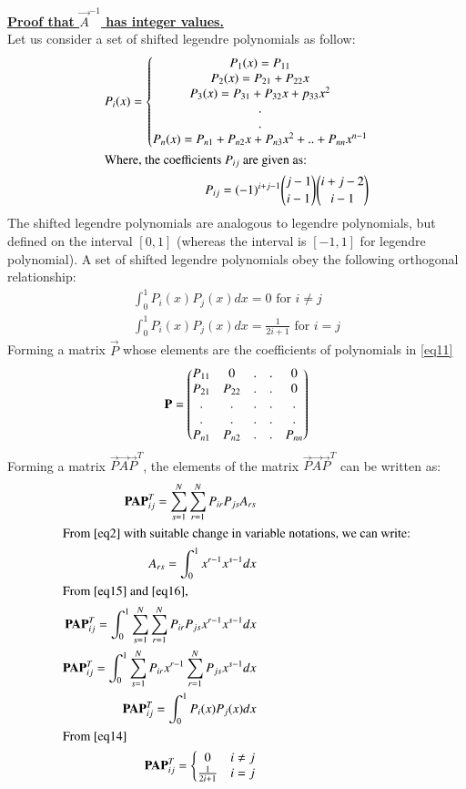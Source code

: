 \documentclass[journal,12pt,twocolumn]{IEEEtran}
\begin{document}
\underline{\textbf{Proof that $\vec{A}^{-1}$ has integer values.}}\\
Let us consider a set of shifted legendre polynomials as follow:
\begin{align}
    P_i(x)=
    \left\{\begin{matrix}
P_1(x)=P_{11}\\ 
P_2(x)=P_{21}+P_{22}x\\
P_3(x)=P_{31}+P_{32}x+p_{33}x^2\\
.\\.\\
P_n(x)=P_{n1}+P_{n2}x+P_{n3}x^2+..+P_{nn}x^{n-1}
\end{matrix}\right. \label{eq11} \\
\intertext{Where, the coefficients $P_{ij}$ are given as:}
P_{ij}=(-1)^{i+j-1} {j-1 \choose i-1} {i+j-2 \choose i-1} \label{eq12}
\end{align}
The shifted legendre polynomials are analogous to legendre polynomials, but defined on the interval $[0,1]$ (whereas the interval is $[-1,1]$ for legendre polynomial). \newpage
A set of shifted legendre polynomials obey the following orthogonal relationship:
\begin{align}
    \int_{0}^{1}P_i(x)P_j(x)dx=0\text{ for }i \neq j\\
    \int_{0}^{1}P_i(x)P_j(x)dx=\frac{1}{2i+1}\text{ for }i=j \label{eq14}
\end{align}
Forming a matrix $\vec{P}$ whose elements are the coefficients of polynomials in \eqref{eq11}
\begin{align}
    \vec{P}=\myvec{P_{11} & 0 &.&.&0\\
    P_{21} & P_{22} &.&.&0\\
    .&.&.&.&.\\.&.&.&.&.\\P_{n1} & P_{n2} &.&.&P_{nn}}
\end{align}
Forming a matrix $\vec{P}\vec{A}\vec{P}^T$, the elements of the matrix $\vec{P}\vec{A}\vec{P}^T$ can be written as:
\begin{align}
    \vec{P}\vec{A}\vec{P}^T_{ij}=\sum_{s=1}^N\sum_{r=1}^NP_{ir}P_{js}A_{rs} \label{eq15}
    \\
    \intertext{From \eqref{eq2} with suitable change in variable notations, we can write:}
    A_{rs}=\int_0^1x^{r-1}x^{s-1}dx \label{eq16}\\
    \intertext{From \eqref{eq15} and \eqref{eq16},}
    \vec{P}\vec{A}\vec{P}^T_{ij}=\int_0^1\sum_{s=1}^N\sum_{r=1}^NP_{ir}P_{js}x^{r-1}x^{s-1}dx\\
    \vec{P}\vec{A}\vec{P}^T_{ij}=\int_0^1\sum_{s=1}^NP_{ir}x^{r-1}\sum_{r=1}^NP_{js}x^{s-1}dx \\
    \vec{P}\vec{A}\vec{P}^T_{ij}=\int_0^1P_i(x)P_j(x)dx\\
    \intertext{From \eqref{eq14}}
    \vec{P}\vec{A}\vec{P}^T_{ij}=
    \left\{\begin{matrix}
    0 & i\neq j\\ 
    \frac{1}{2i+1} & i=j
    \end{matrix}\right.
\end{align}
\end{document}
